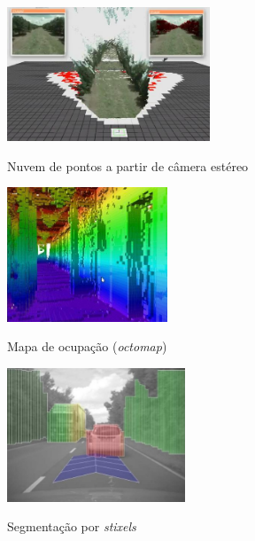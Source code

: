 \vspace{0.5cm}

\begin{figure}[ht]
	\begin{minipage}[b]{0.33\linewidth}
	    \centering
	    \includegraphics[width=\textwidth,height=4cm]{images/nuvem_pontos_caio.jpg}
	 	\caption{Nuvem de pontos a partir de câmera estéreo}
	 	\label{fig:nuvem_pontos}
	\end{minipage}
	\begin{minipage}[b]{0.33\linewidth}
	    \centering
	    \includegraphics[width=\textwidth,height=4cm]{images/octomap.png}
	 	\caption{Mapa de ocupação (\textit{octomap})}
	 	\label{fig:octomap}
	\end{minipage}
	\begin{minipage}[b]{0.33\linewidth}
	    \centering
	    \includegraphics[width=\textwidth,height=4cm]{images/stixel.png}
	 	\caption{Segmentação por \textit{stixels}}
	 	\label{fig:stixel}
	\end{minipage}
\end{figure}

